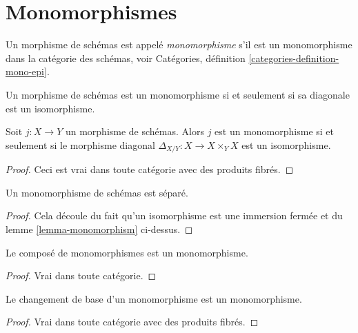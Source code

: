 \section{Monomorphismes}
\label{section-monomorphisms}

\begin{definition}
\label{definition-monomorphism}
Un morphisme de schémas est appelé {\it monomorphisme} s'il est
un monomorphisme dans la catégorie des schémas,
voir Catégories, définition \ref{categories-definition-mono-epi}.
\end{definition}

\begin{lemma}
\label{lemma-monomorphism}
\begin{slogan}
Un morphisme de schémas est un monomorphisme si et seulement si sa diagonale est un isomorphisme.
\end{slogan}
Soit $j : X \to Y$ un morphisme de schémas. Alors
$j$ est un monomorphisme si et seulement si le
morphisme diagonal $\Delta_{X/Y} : X \to X \times_Y X$ est
un isomorphisme.
\end{lemma}

\begin{proof}
Ceci est vrai dans toute catégorie avec des produits fibrés.
\end{proof}

\begin{lemma}
\label{lemma-monomorphism-separated}
Un monomorphisme de schémas est séparé.
\end{lemma}

\begin{proof}
Cela découle du fait qu'un isomorphisme est une immersion fermée et
du lemme \ref{lemma-monomorphism} ci-dessus.
\end{proof}

\begin{lemma}
\label{lemma-composition-monomorphism}
Le composé de monomorphismes est un monomorphisme.
\end{lemma}

\begin{proof}
Vrai dans toute catégorie.
\end{proof}

\begin{lemma}
\label{lemma-base-change-monomorphism}
Le changement de base d'un monomorphisme est un monomorphisme.
\end{lemma}

\begin{proof}
Vrai dans toute catégorie avec des produits fibrés.
\end{proof}

